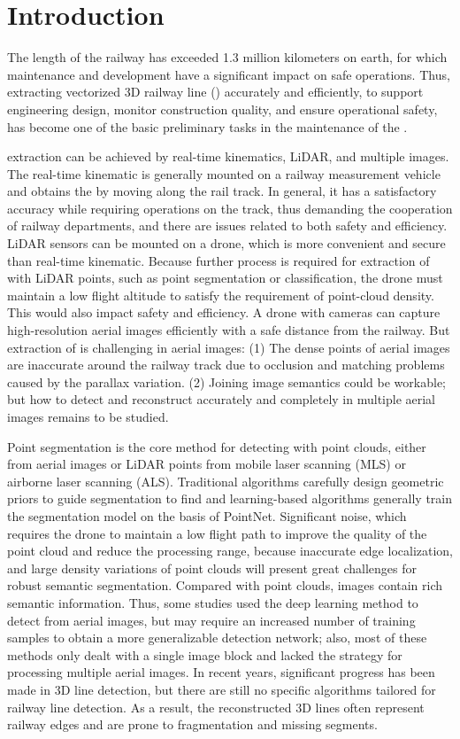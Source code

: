 \section{Introduction}

The length of the railway has exceeded 1.3 million kilometers on earth, 
for which maintenance and development have a significant impact on safe operations.
Thus,
extracting vectorized 3D railway line (\rl) accurately and efficiently, 
to support engineering design, monitor construction quality, 
and ensure operational safety,
has become one of the basic preliminary tasks in the maintenance of the \rl.

\rl extraction can be achieved by real-time kinematics, 
LiDAR,
and multiple images.
The real-time kinematic is generally mounted on a railway measurement vehicle and obtains the \rl by moving along the rail track.
In general, 
it has a satisfactory accuracy while requiring operations on the track,
thus demanding the cooperation of railway departments, 
and there are issues related to both safety and efficiency.
LiDAR sensors can be mounted on a drone, 
which is more convenient and secure than real-time kinematic. 
Because further process is required for extraction of \rl with LiDAR points, 
such as point segmentation or classification,
the drone must maintain a low flight altitude to satisfy the requirement of point-cloud density.
This would also impact safety and efficiency.
A drone with cameras can capture high-resolution aerial images efficiently with a safe distance from the railway.
But extraction of \rl is challenging in aerial images:
(1) The dense points of aerial images are inaccurate around the railway track due to occlusion and matching problems caused by the parallax variation.
(2) Joining image semantics could be workable;
but how to detect and reconstruct \rl accurately and completely in multiple aerial images remains to be studied.

Point segmentation is the core method for detecting \rl with point clouds,
either from aerial images or LiDAR points from mobile laser scanning (MLS) or airborne laser scanning (ALS).
Traditional algorithms carefully design geometric priors to guide segmentation to find \rl and learning-based algorithms generally train the segmentation model on the basis of PointNet. 
Significant noise,
which requires the drone to maintain a low flight path to improve the quality of the point cloud and reduce the processing range,
because inaccurate edge localization, 
and large density variations of point clouds will present great challenges for robust semantic segmentation.
Compared with point clouds,
images contain rich semantic information.
Thus,
some studies used the deep learning method to detect \rl from aerial images,
but may require an increased number of training samples to obtain a more generalizable detection network;
also, 
most of these methods only dealt with a single image block and lacked the strategy for processing multiple aerial images.
In recent years, significant progress has been made in 3D line detection, but there are still no specific algorithms tailored for railway line detection. 
As a result, the reconstructed 3D lines often represent railway edges and are prone to fragmentation and missing segments.

